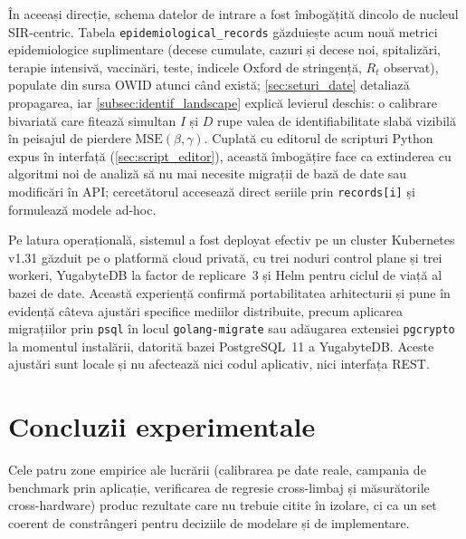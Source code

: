 În aceeași direcție, schema datelor de intrare a fost îmbogățită dincolo de
nucleul SIR-centric. Tabela \texttt{epidemiological\_records} găzduiește acum
nouă metrici epidemiologice suplimentare (decese cumulate, cazuri și decese
noi, spitalizări, terapie intensivă, vaccinări, teste, indicele Oxford de
stringență, $R_t$ observat), populate din sursa OWID atunci când există;
\cref{sec:seturi_date} detaliază propagarea, iar
\cref{subsec:identif_landscape} explică levierul deschis: o calibrare
bivariată care fitează simultan $I$ și $D$ rupe valea de identifiabilitate
slabă vizibilă în peisajul de pierdere $\mathrm{MSE}(\beta, \gamma)$. Cuplată
cu editorul de scripturi Python expus în interfață
(\cref{sec:script_editor}), această îmbogățire face ca extinderea cu
algoritmi noi de analiză să nu mai necesite migrații de bază de date sau
modificări în API; cercetătorul accesează direct seriile prin
\texttt{records[i]} și formulează modele ad-hoc.

Pe latura operațională, sistemul a fost deployat efectiv pe un cluster Kubernetes
v1.31 găzduit pe o platformă cloud privată, cu trei noduri control plane și trei
workeri, YugabyteDB la factor de replicare~3 și Helm pentru ciclul de viață al
bazei de date. Această experiență confirmă portabilitatea arhitecturii și pune
în evidență câteva ajustări specifice mediilor distribuite, precum aplicarea
migrațiilor prin \texttt{psql} în locul \texttt{golang-migrate} sau adăugarea
extensiei \texttt{pgcrypto} la momentul instalării, datorită bazei PostgreSQL~11
a YugabyteDB. Aceste ajustări sunt locale și nu afectează nici codul aplicativ,
nici interfața REST.

{}
\section*{Concluzii experimentale}
\label{sec:concluzii_experimentale}

Cele patru zone empirice ale lucrării (calibrarea pe date reale, campania
de benchmark prin aplicație, verificarea de regresie cross-limbaj și
măsurătorile cross-hardware) produc rezultate care nu trebuie citite în
izolare, ci ca un set coerent de constrângeri pentru deciziile de modelare
și de implementare.

